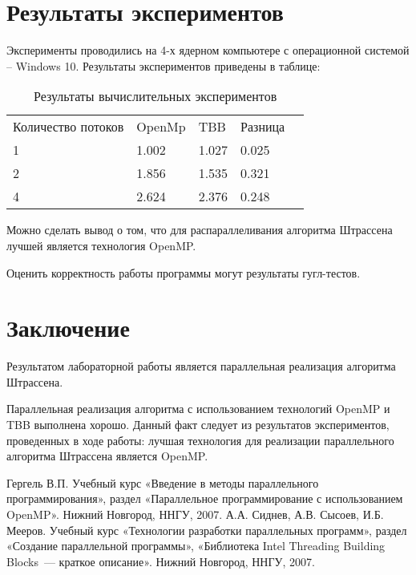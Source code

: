 \documentclass{report}
\begin{document}
\newpage
\section*{Результаты экспериментов}
Эксперименты проводились на 4-х ядерном компьютере с операционной системой – Windows 10. Результаты экспериментов приведены в таблице:
\begin{table}[!h]
\caption{Результаты вычислительных экспериментов}
\centering
\begin{tabular}{lllll}
Количество потоков & OpenMp & TBB & Разница\\
1 & 1.002 & 1.027 & 0.025\\
2 & 1.856 & 1.535 & 0.321\\
4 & 2.624 & 2.376 & 0.248\\
\end{tabular}
\end{table}
\par Можно сделать вывод о том, что для распараллеливания алгоритма Штрассена лучшей является технология OpenMP.

\par Оценить корректность работы программы могут результаты гугл-тестов.
\newpage

\section*{Заключение}
Результатом лабораторной работы является параллельная реализация алгоритма Штрассена.

\par Параллельная реализация алгоритма с использованием технологий OpenMP и TBB выполнена хорошо. Данный факт следует из результатов экспериментов, проведенных в ходе работы: лучшая технология для реализации параллельного алгоритма Штрассена является OpenMP.

\newpage

\begin{thebibliography}{1}
 Гергель В.П. Учебный курс «Введение в методы параллельного программирования», раздел «Параллельное программирование с использованием OpenMP». Нижний Новгород, ННГУ, 2007.
 А.А. Сиднев, А.В. Сысоев, И.Б. Мееров. Учебный курс «Технологии разработки параллельных программ», раздел «Создание параллельной программы», «Библиотека Intel Threading Building Blocks~--- краткое описание». Нижний Новгород, ННГУ, 2007. 

\end{thebibliography}
\newpage
\end{document}
